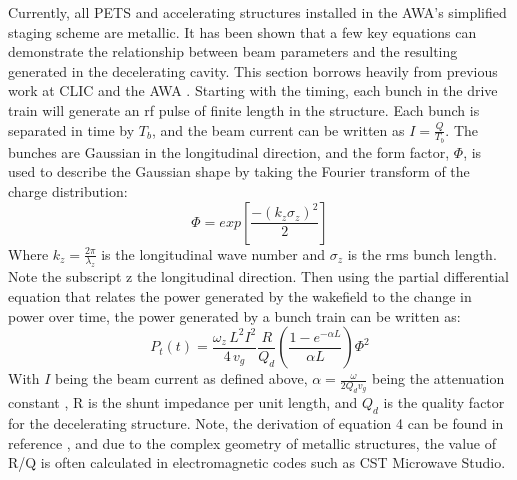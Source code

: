 
Currently, all  PETS and accelerating structures installed in the AWA's
simplified staging scheme are metallic. It has been shown that a few
key equations can demonstrate the relationship between beam parameters
and the resulting  generated in the decelerating cavity. This section
borrows heavily from previous work at CLIC and the AWA \cite{key-3,key-8}. 
Starting with the timing, each bunch in the drive train will generate
an rf pulse of finite length in the structure. Each bunch is separated
in time by $T_{b}$, and the  beam current can be written as $I=\frac{Q}{T_{b}}$.
 The bunches are Gaussian in the longitudinal direction, and the form
factor, $\Phi$, is used to describe the Gaussian shape by taking
the Fourier transform of the charge distribution: 
\begin{equation}
\Phi=exp\left[\frac{-(k_{z}\sigma_{z})^{2}}{2}\right]
\end{equation}
Where $k_{z}=\frac{2\pi}{\lambda_{z}}$ is the longitudinal wave number
and $\sigma_{z}$ is the rms bunch length.   Note the subscript z  the longitudinal
direction. Then using the partial differential equation that relates
the power generated by the wakefield to the change in power over time, 
the power generated by a bunch train can be written as:
\begin{equation} \label{eq:rfpower}
P_{t}(t)=\frac{\omega_{z}\,L^{2}I^{2}}{4\,v_{g}}\frac{R}{Q_{d}}\left(\frac{1-e^{-\alpha L}}{\alpha L}\right)\Phi^{2}
\end{equation}
With $I$ being the beam current as defined above, $\alpha=\frac{\omega}{2Q_{d}v_{g}}$
being the attenuation constant \cite{key-9}, R is the shunt impedance
per unit length, and $Q_{d}$ is the quality factor for the decelerating
structure.  Note, the derivation of equation 4 can be found in reference
\cite{key-8}, and due to the complex geometry of metallic structures,
the value of R/Q is often calculated in electromagnetic codes such
as CST Microwave Studio. 

